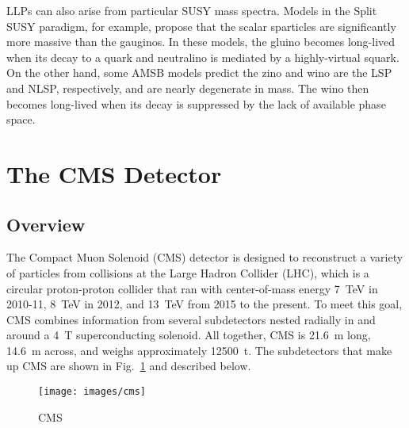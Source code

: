 \documentclass[12pt]{article}
\begin{document}
    LLPs can also arise from particular SUSY mass spectra. Models in the Split  SUSY paradigm, for example, propose that the scalar sparticles are significantly more massive than the gauginos. In these models, the gluino becomes long-lived when its decay to a quark and neutralino is mediated by a highly-virtual squark.   On the other hand, some AMSB models predict the zino and wino are the LSP and NLSP, respectively, and are nearly degenerate in mass. The wino then becomes long-lived when its decay is suppressed by the lack of available phase space. 

\section{The CMS Detector}
    \subsection{Overview}
        The Compact Muon Solenoid (CMS) detector is designed to reconstruct a variety of particles from collisions at the Large Hadron Collider (LHC), which is a circular proton-proton collider that ran with center-of-mass energy \SI{7}{\tera\electronvolt} in 2010-11, \SI{8}{\tera\electronvolt} in 2012, and \SI{13}{\tera\electronvolt} from 2015 to the present. To meet this goal, CMS combines information from several subdetectors nested radially in and around a \SI{4}{\tesla} superconducting solenoid. All together, CMS is \SI{21.6}{\m} long, \SI{14.6}{\m} across, and weighs approximately \SI{12500}{t}. The subdetectors that make up CMS are shown in Fig.~\ref{cms} and described below.

        \noindent \begin{figure}[htbp] \begin{center}
        \texttt{[image: images/cms]}
            \caption{CMS}
        \label{cms}
        \end{center} \end{figure}
\end{document}
